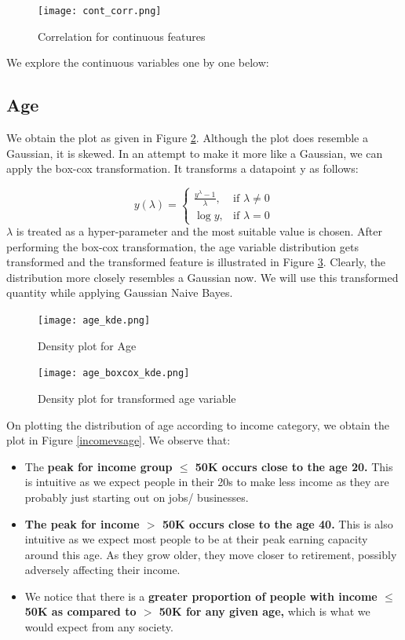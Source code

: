 \documentclass[conference]{IEEEtran}
\begin{document}
\begin{figure}[tbh]
\centering
\texttt{[image: cont\_corr.png]}
\caption{Correlation for continuous features}
\label{cont_corr}
\end{figure}

We explore the continuous variables one by one below:

\subsection*{Age}

We obtain the plot as given in Figure \ref{age_kde}. Although the plot does resemble a Gaussian, it is skewed. In an attempt to make it more like a Gaussian, we can apply the box-cox transformation. It transforms a datapoint y as follows:

$$
    y(\lambda)= 
\begin{cases}
    \frac{y^{\lambda} - 1}{\lambda},& \text{if } \lambda \neq 0\\
    \log y,              & \text{if } \lambda = 0
\end{cases}
$$ $\lambda$ is treated as a hyper-parameter and the most suitable value is chosen. After performing the box-cox transformation, the age variable distribution gets transformed and the transformed feature is illustrated in Figure \ref{age_boxcox_kde}. Clearly, the distribution more closely resembles a Gaussian now. We will use this transformed quantity while applying Gaussian Naive Bayes.

\begin{figure}[tbh]
\centering
\texttt{[image: age\_kde.png]}
\caption{Density plot for Age}
\label{age_kde}
\end{figure}

\begin{figure}[tbh]
\centering
\texttt{[image: age\_boxcox\_kde.png]}
\caption{Density plot for transformed age variable}
\label{age_boxcox_kde}
\end{figure}

On plotting the distribution of age according to income category, we obtain the plot in Figure \ref{incomevsage}. We observe that:

\begin{itemize}
    \item The \textbf{peak for income group $\leq$ 50K occurs close to the age 20.} This is intuitive as we expect people in their 20s to make less income as they are probably just starting out on jobs/ businesses.
    \item \textbf{The peak for income $>$ 50K occurs close to the age 40.} This is also intuitive as we expect most people to be at their peak earning capacity around this age. As they grow older, they move closer to retirement, possibly adversely affecting their income.
    \item We notice that there is a \textbf{greater proportion of people with income $\leq$ 50K as compared to $>$ 50K for any given age,} which is what we would expect from any society.
\end{itemize}
\end{document}
